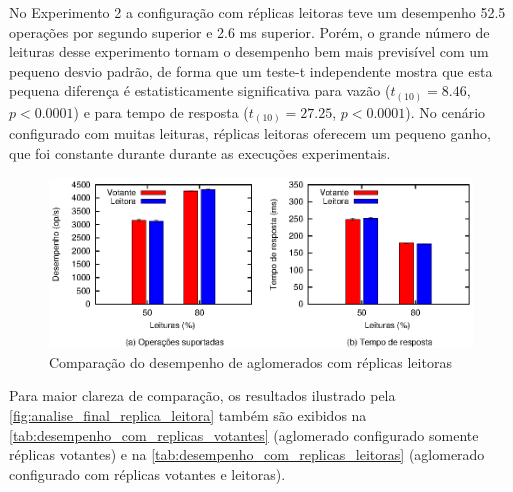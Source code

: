 No Experimento 2 a configuração com réplicas leitoras teve um desempenho 52.5 operações
por segundo superior e 2.6 ms superior. Porém, o grande número de leituras desse
experimento tornam o desempenho bem mais previsível com um pequeno desvio padrão, de forma
que um teste-t independente mostra que esta pequena diferença é estatisticamente
significativa para vazão ($t_{(10)}=8.46$, $p < 0.0001$) e para tempo de resposta
($t_{(10)}=27.25$, $p < 0.0001$). No cenário configurado com muitas leituras, réplicas
leitoras oferecem um pequeno ganho, que foi constante durante durante as execuções
experimentais.

\begin{figure}[ht]
  \centering
  \includegraphics[width=14cm]{conteudo/capitulos/figuras/final-replica-leitora.eps}
  \caption{Comparação do desempenho de aglomerados com réplicas leitoras}
  \label{fig:analise_final_replica_leitora}
\end{figure}

Para maior clareza de comparação, os resultados ilustrado pela
\autoref{fig:analise_final_replica_leitora} também são exibidos na
\autoref{tab:desempenho_com_replicas_votantes} (aglomerado configurado somente réplicas
votantes) e na \autoref{tab:desempenho_com_replicas_leitoras} (aglomerado configurado com
réplicas votantes e leitoras).

\begin{table}[htb]
\end{table}

